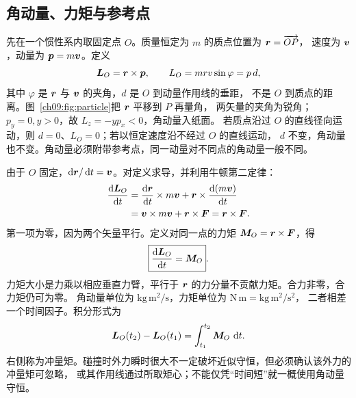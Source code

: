 {\subsection{角动量、力矩与参考点}
先在一个惯性系内取固定点 $O$。质量恒定为 $m$ 的质点位置为 $\vect r=\overrightarrow{OP}$，
速度为 $\vect v$，动量为 $\vect p=m\vect v$。定义
\begin{equation}
 \vect L_O=\vect r\times\vect p,\qquad L_O=mrv\sin\varphi=p\,d,
\end{equation}
其中 $\varphi$ 是 $\vect r$ 与 $\vect v$ 的夹角，$d$ 是 $O$ 到动量作用线的垂距，
不是 $O$ 到质点的距离。图~\ref{ch09:fig:particle}把 $\vect r$ 平移到 $P$ 再量角，
两矢量的夹角为锐角；$p_y=0,y>0$，故 $L_z=-yp_x<0$，角动量入纸面。
\particleAngularMomentumDiagram
若质点沿过 $O$ 的直线径向运动，则 $d=0$、$L_O=0$；若以恒定速度沿不经过 $O$ 的直线运动，
$d$ 不变，角动量也不变。角动量必须附带参考点，同一动量对不同点的角动量一般不同。

由于 $O$ 固定，$\dd\vect r/\dd t=\vect v$。对定义求导，并利用牛顿第二定律：
\begin{align}
 \frac{\dd\vect L_O}{\dd t}
 &=\frac{\dd\vect r}{\dd t}\times m\vect v+
   \vect r\times\frac{\dd(m\vect v)}{\dd t}\\
 &=\vect v\times m\vect v+\vect r\times\vect F
 =\vect r\times\vect F.
\end{align}
第一项为零，因为两个矢量平行。定义对同一点的力矩 $\vect M_O=\vect r\times\vect F$，得
\begin{equation}
 \boxed{\frac{\dd\vect L_O}{\dd t}=\vect M_O}.\label{ch09:eq:angular-law}
\end{equation}
力矩大小是力乘以相应垂直力臂，平行于 $\vect r$ 的力分量不贡献力矩。合力非零，合力矩仍可为零。
角动量单位为 $\mathrm{kg\,m^2/s}$，力矩单位为 $\mathrm{N\,m}=\mathrm{kg\,m^2/s^2}$，
二者相差一个时间因子。积分形式为
\begin{equation}
 \vect L_O(t_2)-\vect L_O(t_1)=\int_{t_1}^{t_2}\vect M_O\,\dd t.
\end{equation}
右侧称为冲量矩。碰撞时外力瞬时很大不一定破坏近似守恒，但必须确认该外力的冲量矩可忽略，
或其作用线通过所取矩心；不能仅凭“时间短”就一概使用角动量守恒。

}
